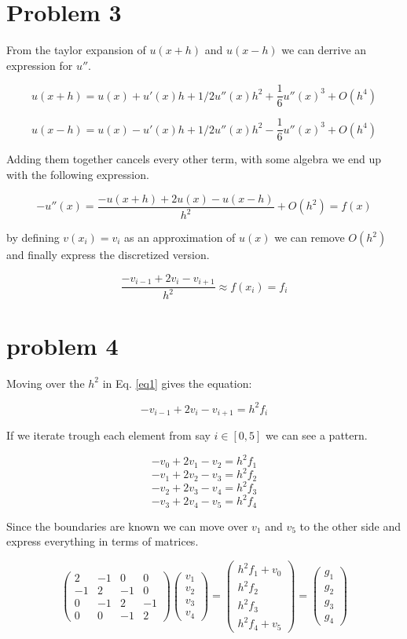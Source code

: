 \documentclass[english,notitlepage]{revtex4-1}
\begin{document}
	\section*{Problem 3}
	From the taylor expansion of $u(x+h)$ and $u(x-h)$ we can derrive an expression for $u''$.
	
	
		\[u(x+h) = u(x) + u'(x)h + 1/2 u''(x)h^2 + \frac{1}{6}u''(x)^3 + O(h^4)\]
		
		\[u(x-h) = u(x) - u'(x)h + 1/2 u''(x)h^2 - \frac{1}{6}u''(x)^3 + O(h^4)\]
		
	Adding them together cancels every other term, with some algebra we end up with the following expression.
	
	
		$$-u''(x) =\frac{-u(x+h)+2u(x)-u(x-h)}{h^2} +O(h^2) = f(x)$$
	

	by defining $v(x_i) = v_i$ as an approximation of $u(x)$ we can remove $O(h^2)$ and finally express the discretized version.
	
	\begin{equation}\label{eq1}
	\frac{-v_{i-1} + 2v_{i} - v_{i+1}}{h^2} \approx f(x_i) = f_i
	\end{equation}

	\section*{problem 4}
	Moving over the $h^2$ in Eq. \ref{eq1} gives the equation:
	
	$$ -v_{i-1} + 2v_{i} - v_{i+1} = h^2f_i$$
	
	If we iterate trough each element from say $i  \in [0,5]$ we can see a pattern.
	
	$$ -v_0 + 2v_1 -v_2 = h^2f_1 $$ 
	$$ -v_1 + 2v_2 -v_3 = h^2f_2 $$ 
	$$ -v_2 + 2v_3 -v_4 = h^2f_3 $$ 
	$$ -v_3 + 2v_4 -v_5 = h^2f_4 $$ 
	
	Since the boundaries are known we can move over $v_1$ and $v_5$ to the other side and express everything in terms of matrices.
	
	\[
	\begin{pmatrix}
		2 & -1 & 0 & 0\\
		-1 & 2 & -1 & 0\\
		0 & -1 & 2 & -1\\
		0 & 0 & -1 & 2
	\end{pmatrix}
	\begin{pmatrix}
		v_1\\v_2\\v_3\\v_4
	\end{pmatrix}
	=
 	\begin{pmatrix}
 		h^2f_1+v_0\\h^2f_2\\h^2f_3\\h^2f_4+v_5
 	\end{pmatrix}
 	=
 	\begin{pmatrix}
 		g_1\\g_2\\g_3\\g_4
 	\end{pmatrix}
	\] 
	
\end{document}
